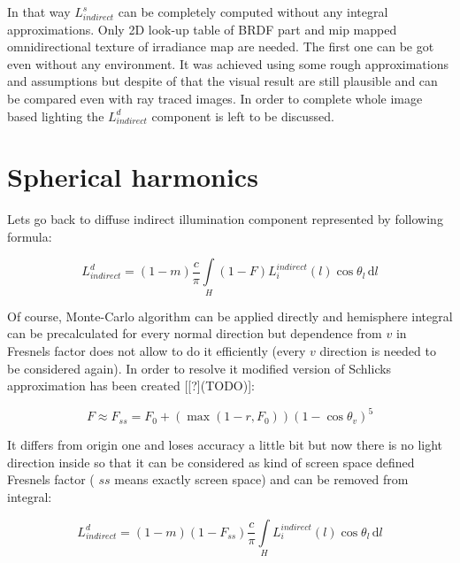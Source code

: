In that way $L_{indirect}^s$ can be completely computed without any integral approximations. Only 2D look-\/up table of B\+R\+DF part and mip mapped omnidirectional texture of irradiance map are needed. The first one can be got even without any environment. It was achieved using some rough approximations and assumptions but despite of that the visual result are still plausible and can be compared even with ray traced images. In order to complete whole image based lighting the $L_{indirect}^d$ component is left to be discussed.\hypertarget{specification__pbr_math_pbr_spherical_harmonics}{}\section{Spherical harmonics}\label{specification__pbr_math_pbr_spherical_harmonics}
Lets go back to diffuse indirect illumination component represented by following formula\+:

\[L_{indirect}^d = (1-m)\frac{c}{\pi}\int\limits_H (1-F)L_i^{indirect}(l)\cos\theta_l\, \mathrm{d}l\]

Of course, Monte-\/\+Carlo algorithm can be applied directly and hemisphere integral can be precalculated for every normal direction but dependence from $v$ in Fresnel\textquotesingle{}s factor does not allow to do it efficiently (every $v$ direction is needed to be considered again). In order to resolve it modified version of Schlick\textquotesingle{}s approximation has been created \mbox{[}\mbox{[}?\mbox{]}(T\+O\+DO)\mbox{]}\+:

\[F \approx F_{ss}=F_0+(\max(1-r, F_0))(1-\cos\theta_v)^5\]

It differs from origin one and loses accuracy a little bit but now there is no light direction inside so that it can be considered as kind of screen space defined Fresnel\textquotesingle{}s factor ( $ss$ means exactly \textquotesingle{}screen space\textquotesingle{}) and can be removed from integral\+:

\[L_{indirect}^d = (1-m)(1-F_{ss})\frac{c}{\pi} \int\limits_H L_i^{indirect}(l) \cos\theta_l\, \mathrm{d}l\]

